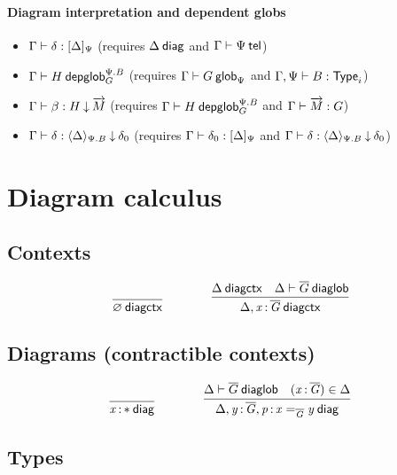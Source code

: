 \paragraph{Diagram interpretation and dependent globs}

\begin{itemize}
\item ${\Gamma} \vdash {\delta} : {[ \Delta ]_{\Psi}}$
(requires $\Delta \: \mathsf{diag}$ and ${\Gamma} \vdash {\Psi} \: \mathsf{tel}$)
\item ${\Gamma} \vdash {H} \: \mathsf{depglob}^{\Psi.B}_{G}$
(requires ${\Gamma} \vdash {G} \: \mathsf{glob}_{\Psi}$ and ${\Gamma,\Psi} \vdash {B} : {\mathsf{Type}_{i}}$)
\item ${\Gamma} \vdash {\beta} : {H}\mathbin{\downarrow}{\overrightarrow{M}}$
(requires ${\Gamma} \vdash {H} \: \mathsf{depglob}^{\Psi.B}_{G}$
and ${\Gamma} \vdash {\ensuremath{\overrightarrow{M}}} : {G}$)
\item ${\Gamma} \vdash {\delta} : {\langle \Delta \rangle_{\Psi.B}}\mathbin{\downarrow}{\delta_0}$
(requires ${\Gamma} \vdash {\delta_0} : {[ \Delta ]_{\Psi}}$
and ${\Gamma} \vdash {\delta} : {\langle \Delta \rangle_{\Psi.B}}\mathbin{\downarrow}{\delta_0}$)
\end{itemize}

\section{Diagram calculus}

\subsection{Contexts}

\begin{small}
  \[
  \infer{\wfdiagctx{\emptyctx}}{}
  \qquad\qquad
  \infer
  {\wfdiagctx{\Delta,\tptm{x}{\diag G}}}
  {\wfdiagctx{\Delta} & \wfdiaglob{\Delta}{\diag G}}\]
\end{small}

\subsection{Diagrams (contractible contexts)}


\begin{small}
  \[
  \infer{\wfdiag{\tptm{x}{\diagbase}}}{}
  \qquad\qquad
  \infer{\wfdiag{\Delta,\tptm{y}{\diag G},\tptm{p}{\homj{\diag{G}}{x}{y}}}}
  {\wfdiaglob{\Delta}{\diag G}
    & (\tptm{x}{\diag{G}}) \in \Delta}\]
\end{small}

\subsection{Types}

